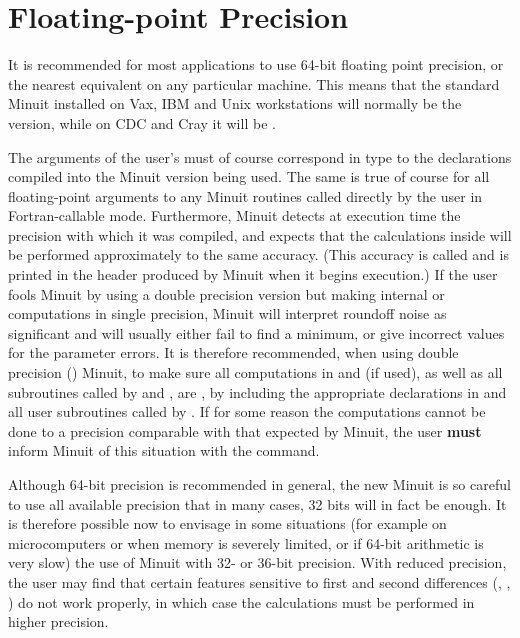 \section{Floating-point Precision}

It is recommended for most applications to use 64-bit floating point
precision, or the nearest equivalent on any particular machine.
This means that the standard Minuit installed on Vax, IBM
and Unix workstations will normally be the  version, 
while on CDC and Cray it will be .
 
The arguments of the
user's  must of course correspond in type to the declarations
compiled into the Minuit version being used.
The same is true of course for all floating-point arguments
to any Minuit routines called directly by the user in
Fortran-callable mode.
Furthermore, Minuit detects at execution time the precision
with which it was compiled, and expects that the calculations inside
 will be performed approximately to the same accuracy.
(This accuracy is called  and is printed in the header produced
by Minuit when it begins execution.)
If the user fools Minuit by using a double precision version but
making internal  or 
computations in single precision, Minuit will
interpret roundoff noise as significant and will usually either fail
to find a minimum, or give incorrect values for the parameter errors.
It is therefore recommended, when using
double precision () Minuit, to make sure all computations
in  and  (if used), as well as all subroutines called
by  and , are ,
by including the appropriate  declarations in 
and all user subroutines called by .
If for some reason the computations cannot be done to a precision
comparable with that expected by Minuit, the user {\bf must} inform Minuit
of this situation with the  command.
 
Although 64-bit precision is recommended in general,
the new Minuit is so careful to use all available precision that in
many cases, 32 bits will in fact be enough.
It is therefore possible now to envisage in some situations
(for example on microcomputers or when memory is severely limited,
or if 64-bit arithmetic is very slow) the use of Minuit with
32- or 36-bit precision.
With reduced precision, the user may find that certain features
sensitive to first and second differences 
(, , )
do not work properly, in which case the calculations must be 
performed in higher precision.
